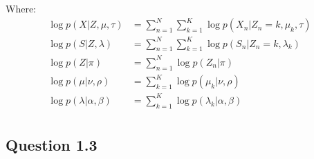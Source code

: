 \documentclass{article}
\begin{document}
Where:
\begin{equation}
  \begin{split}
    \log p(X|Z,\mu,\tau)         & = \sum_{n=1}^{N}\sum_{k=1}^{K}\log p(X_n|Z_n = k, \mu_k, \tau) \\
    \log p(S|Z,\lambda)          & = \sum_{n=1}^{N}\sum_{k=1}^{K}\log p(S_n|Z_n = k, \lambda_k)   \\
    \log p(Z|\pi)                & = \sum_{n=1}^{N}\log p(Z_n|\pi)                                \\
    \log p(\mu|\nu,\rho)         & = \sum_{k=1}^{K}\log p(\mu_k|\nu,\rho)                         \\
    \log p(\lambda|\alpha,\beta) & = \sum_{k=1}^{K}\log p(\lambda_k|\alpha,\beta)                 \\
  \end{split}
\end{equation}

\subsection{Question 1.3}
\end{document}
